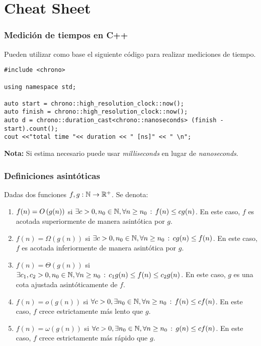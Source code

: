 \section*{Cheat Sheet}

\subsubsection*{Medici\'on de tiempos en C++}

Pueden utilizar como base el siguiente código para realizar mediciones de tiempo.
\begin{scriptsize}
\begin{verbatim}
#include <chrono>

using namespace std;

auto start = chrono::high_resolution_clock::now();
auto finish = chrono::high_resolution_clock::now();
auto d = chrono::duration_cast<chrono::nanoseconds> (finish - start).count();
cout <<"total time "<< duration << " [ns]" << " \n";
\end{verbatim}
\end{scriptsize}
\textbf{Nota:} Si estima necesario puede usar \textit{milliseconds} en lugar de \textit{nanoseconds}.

\subsubsection*{Definiciones asintóticas}

Dadas dos funciones $f,g:\mathbb{N}\to\mathbb{R}^+$. Se denota:
\begin{enumerate}
    \item $f(n)=O\left(g(n)\right)$ si $\exists 
    c>0,n_0\in\mathbb{N},\forall n\geq n_0\,:\,f(n)\leq cg(n)$. En este caso, $f$ es acotada superiormente de manera asintótica por $g$.
    
    \item $f(n)=\Omega(g(n))$ si $\exists c>0,n_0\in\mathbb{N},\forall n\geq n_0\,:\,cg(n)\leq f(n)$. En este caso, $f$ es acotada inferiormente de manera asintótica por $g$.
    
    \item $f(n)=\Theta(g(n))$ si $\exists c_1,c_2>0,n_0\in\mathbb{N},\forall n\geq n_0\,:\,c_1g(n)\leq f(n)\leq c_2 g(n)$. En este caso, $g$ es una cota ajustada asintóticamente de $f$.

    \item $f(n)=o(g(n))$ si $\forall c>0,\exists n_0\in\mathbb{N},\forall n\geq n_0\,:\,f(n)\leq cf(n)$. En este caso, $f$ crece estrictamente más lento que $g$.

    \item $f(n)=\omega(g(n))$ si $\forall c>0,\exists n_0\in\mathbb{N},\forall n\geq n_0\,:\,g(n)\leq cf(n)$. En este caso, $f$ crece estrictamente más rápido que $g$.
\end{enumerate}

